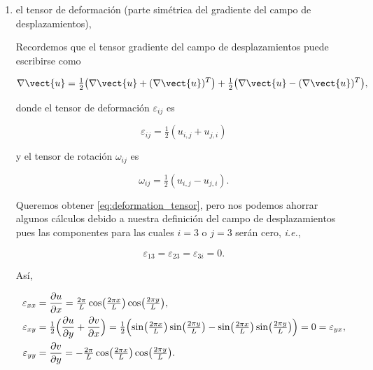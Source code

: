 \documentclass[./../main.tex]{subfiles}
\begin{document}
\begin{enumerate}[label=\arabic*)]
        \item el tensor de deformación (parte simétrica del gradiente del campo de desplazamientos),
        
        Recordemos que el tensor gradiente del campo de desplazamientos puede escribirse como

        \begin{equation*}
            \grad{\vect{u}} = \tfrac{1}{2}\bigl(\grad{\vect{u}} + (\grad{\vect{u}})^{T}\bigr) + \tfrac{1}{2}\bigl(\grad{\vect{u}} - (\grad{\vect{u}})^{T}\bigr),
        \end{equation*}

        donde el tensor de deformación \(\varepsilon_{ij}\) es

        \begin{equation}
            \varepsilon_{ij} = \tfrac{1}{2}(u_{i,j} + u_{j,i})
            \label{eq:deformation_tensor}
        \end{equation}

        y el tensor de rotación \(\omega_{ij}\) es

        \begin{equation}
            \omega_{ij} = \tfrac{1}{2}(u_{i,j} - u_{j,i}).
            \label{eq:rotation_tensor}
        \end{equation}

        Queremos obtener \cref{eq:deformation_tensor}, pero nos podemos ahorrar algunos cálculos debido a nuestra definición del campo de desplazamientos pues las componentes para las cuales \(i = 3\) o \(j = 3\) serán cero, \emph{i.e.},

        \begin{equation*}
            \varepsilon_{13} = \varepsilon_{23} = \varepsilon_{3i} = 0.
        \end{equation*}

        Así,

        \begin{align*}
            \varepsilon_{xx} &= \pdv{u}{x} = \tfrac{2\pi}{L}\cos\bigl(\tfrac{2\pi x}{L}\bigr)\cos\bigl(\tfrac{2\pi y}{L}\bigr),\\
            \varepsilon_{xy} &= \tfrac{1}{2}\Bigl(\pdv{u}{y} + \pdv{v}{x}\Bigr) = \tfrac{1}{2}\Bigl(\sin\bigl(\tfrac{2\pi x}{L}\bigr)\sin\bigl(\tfrac{2\pi y}{L}\bigr) - \sin\bigl(\tfrac{2\pi x}{L}\bigr)\sin\bigl(\tfrac{2\pi y}{L}\bigr)\Bigr) = 0 = \varepsilon_{yx},\\
            \varepsilon_{yy} &= \pdv{v}{y} = -\tfrac{2\pi}{L}\cos\bigl(\tfrac{2\pi x}{L}\bigr)\cos\bigl(\tfrac{2\pi y}{L}\bigr).
        \end{align*}


\end{enumerate}
\end{document}
